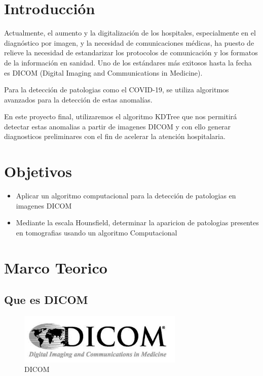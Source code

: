 \documentclass{article}
\begin{document}
\section{Introducción}
   Actualmente, el aumento y la  digitalización de los hospitales, especialmente en el diagnóstico  por imagen, y la necesidad de comunicaciones médicas, ha puesto de relieve la necesidad de estandarizar los protocolos de comunicación y los formatos de la información en sanidad. 
   Uno de los estándares más exitosos hasta la fecha es DICOM (Digital Imaging and Communications in Medicine). 
   
   Para la detección de patologias como el COVID-19, se utiliza algoritmos avanzados para la detección de estas anomalías. 
   
    En este proyecto final, utilizaremos el algoritmo KDTree que nos  permitirá detectar estas anomalias a partir de imagenes DICOM y con ello generar diagnosticos preliminares con el fin de acelerar la atención hospitalaria.

 \section{Objetivos}
 \begin{itemize}
	\item Aplicar un algoritmo computacional para la detección de patologias en imagenes DICOM
	\item Mediante la escala Hounsfield, determinar la aparicion de patologias presentes en tomografias usando un algoritmo Computacional
	\end{itemize}
	
\section{Marco Teorico}
\subsection{Que es DICOM}

\begin{figure}[H]
\centering
\includegraphics[width=0.7\textwidth]{img/dicom.jpg}
\caption{DICOM}
\end{figure}
\end{document}
